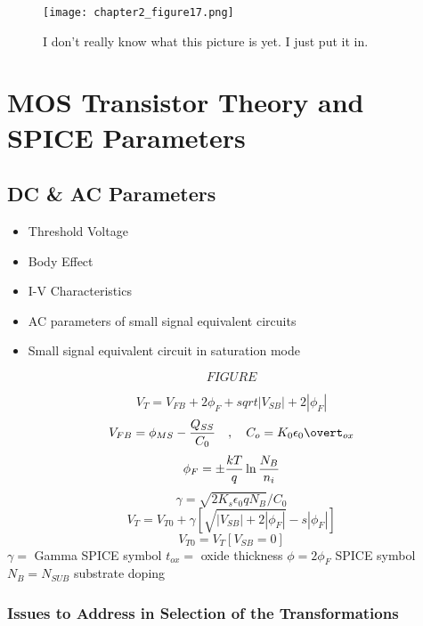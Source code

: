 \documentclass[11pt,fleqn]{book} %
\begin{document}
\begin{figure}[h]
  \centering\texttt{[image: chapter2\_figure17.png]}
  \caption{I don't really know what this picture is yet. I just put it in.}
\end{figure}



\chapter{MOS Transistor Theory and SPICE Parameters}

\section{DC & AC Parameters}

\begin{itemize}
 \item Threshold Voltage
 \item Body Effect
 \item I-V Characteristics
 \item AC parameters of small signal equivalent circuits
 \item Small signal equivalent circuit in saturation mode
\end{itemize}

$$FIGURE$$

$$V_T=V_{FB}+2\phi_F+sqrt{|V_{SB}|+2|\phi_F|}$$
$$V_{FB}=\phi_{MS}-{Q_{SS}\over C_0}\quad,\quad C_o={K_0 \epsilon_0\overt_{ox}}$$
$$\phi_F=\pm{kT\over q}\ln{N_B\over n_i}$$
$$\gamma=\sqrt{2K_s\epsilon_0 qN_B}/C_0$$
$$V_T=V_{T0}+\gamma[\sqrt{|V_{SB}|+2|\phi_F|}-s|\phi_F|]$$
$$V_{T0}=V_T[V_{SB}=0]$$
$\gamma=$ Gamma SPICE symbol
$t_{ox}=$ oxide thickness
$\phi=2\phi_F$ SPICE symbol
$N_B=N_{SUB}$ substrate doping


\subsection{Issues to Address in Selection of the Transformations}

\end{document}

